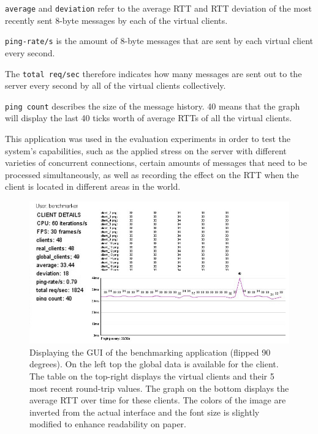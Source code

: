 \documentclass[bsc, 12pt, twoside, singlespacing, parskip, abbrevs, notimes, normalheadings, logo]{styles/infthesis}
\begin{document}
\texttt{average} and \texttt{deviation} refer to the average RTT and RTT deviation of the most recently sent 8-byte messages by each of the virtual clients.

\texttt{ping-rate/s} is the amount of 8-byte messages that are sent by each virtual client every second.

The \texttt{total req/sec} therefore indicates how many messages are sent out to the server every second by all of the virtual clients collectively.

\texttt{ping count} describes the size of the message history. 40 means that the graph will display the last 40 ticks worth of average RTTs of all the virtual clients.

This application was used in the evaluation experiments in order to test the system's capabilities, such as the applied stress on the server with different varieties of concurrent connections, certain amounts of messages that need to be processed simultaneously, as well as recording the effect on the RTT when the client is located in different areas in the world.

\begin{figure}[H]
\centering
\includegraphics[scale=0.50, angle=00]{images/benchmarker.jpg}
\caption{Displaying the GUI of the benchmarking application (flipped 90 degrees). On the left top the global data is available for the client. The table on the top-right displays the virtual clients and their 5 most recent round-trip values. The graph on the bottom displays the average RTT over time for these clients. The colors of the image are inverted from the actual interface and the font size is slightly modified to enhance readability on paper.}
\label{fig:benchmark_gui}
\vspace{1em}
\end{figure}
\end{document}
